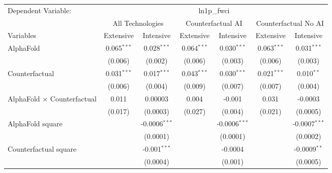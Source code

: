 \begingroup
\centering
\begin{tabular}{lcccccc}
   \tabularnewline \midrule \midrule
   Dependent Variable: & \multicolumn{6}{c}{ln1p\_fwci}\\
 & \multicolumn{2}{c}{All Technologies} & \multicolumn{2}{c}{Counterfactual AI} & \multicolumn{2}{c}{Counterfactual No AI} \\
\cmidrule(lr){1-1}\cmidrule(lr){2-3} \cmidrule(lr){4-5} \cmidrule(lr){6-7}
Variables & \multicolumn{1}{c}{Extensive} & \multicolumn{1}{c}{Intensive} & \multicolumn{1}{c}{Extensive} & \multicolumn{1}{c}{Intensive} & \multicolumn{1}{c}{Extensive} & \multicolumn{1}{c}{Intensive} \\
\cmidrule(lr){1-1}\cmidrule(lr){2-2} \cmidrule(lr){3-3} \cmidrule(lr){4-4} \cmidrule(lr){5-5} \cmidrule(lr){6-6} \cmidrule(lr){7-7}
   AlphaFold                          & 0.065$^{***}$ & 0.028$^{***}$     & 0.064$^{***}$ & 0.030$^{***}$   & 0.063$^{***}$ & 0.031$^{***}$\\   
                                      & (0.006)       & (0.002)           & (0.006)       & (0.003)         & (0.006)       & (0.003)\\   
   Counterfactual                     & 0.031$^{***}$ & 0.017$^{***}$     & 0.043$^{***}$ & 0.030$^{***}$   & 0.021$^{***}$ & 0.010$^{**}$\\   
                                      & (0.006)       & (0.004)           & (0.009)       & (0.007)         & (0.007)       & (0.004)\\   
   AlphaFold $\times$ Counterfactual  & 0.011         & 0.00003           & 0.004         & -0.001          & 0.031         & -0.0003\\   
                                      & (0.017)       & (0.0003)          & (0.027)       & (0.004)         & (0.021)       & (0.0005)\\   
   AlphaFold square                   &               & -0.0006$^{***}$   &               & -0.0006$^{***}$ &               & -0.0007$^{***}$\\   
                                      &               & (0.0001)          &               & (0.0001)        &               & (0.0002)\\   
   Counterfactual square              &               & -0.001$^{***}$    &               & -0.0004         &               & -0.0009$^{**}$\\   
                                      &               & (0.0004)          &               & (0.001)         &               & (0.0005)\\   

\end{tabular}
